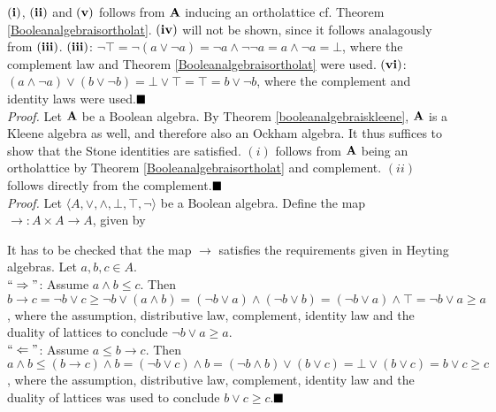 ${\bf (i)}$, ${\bf (ii)}$ and ${\bf (v)}$ follows from ${\bf A}$ inducing an ortholattice cf. Theorem \ref{Booleanalgebraisortholat}. ${\bf (iv)}$ will not be shown, since it follows analagously from ${\bf (iii)}$. ${\bf (iii)}$: $\lnot\top = \lnot(a\lor\lnot a)=\lnot a\land \lnot\lnot a = a\land\lnot a = \bot$, where the complement law and Theorem \ref{Booleanalgebraisortholat} were used. ${\bf (vi)}$: $(a\land\lnot a)\lor (b\lor \lnot b)=\bot\lor\top=\top=b\lor\lnot b$, where the complement and identity laws were used.$\qed$\\

\textit{Proof.}
Let ${\bf A}$ be a Boolean algebra. By Theorem \ref{booleanalgebraiskleene}, ${\bf A}$ is a Kleene algebra as well, and therefore also an Ockham algebra. It thus suffices to show that the Stone identities are satisfied. $(i)$ follows from ${\bf A}$ being an ortholattice by Theorem \ref{Booleanalgebraisortholat} and complement. $(ii)$ follows directly from the complement.$\qed$\\

\textit{Proof.}
Let $\langle A,\lor,\land,\bot,\top,\lnot\rangle$ be a Boolean algebra. Define the map $\to:A\times A\to A$, given by

It has to be checked that the map $\to$ satisfies the requirements given in Heyting algebras. Let $a,b,c\in A$.\\

$``\Rightarrow"$: Assume $a\land b\leq c$. Then $b\to c=\lnot b\lor c\geq \lnot b\lor (a\land b)=(\lnot b\lor a)\land(\lnot b\lor b)=(\lnot b\lor a)\land\top=\lnot b\lor a\geq a$, where the assumption, distributive law, complement, identity law and the duality of lattices to conclude $\lnot b\lor a\geq a$.\\

$``\Leftarrow"$: Assume $a\leq b\to c$. Then $a\land b\leq (b\to c)\land b=(\lnot b\lor c)\land b=(\lnot b\land b)\lor(b\lor c)=\bot\lor(b\lor c)=b\lor c\geq c$, where the assumption, distributive law, complement, identity law and the duality of lattices was used to conclude $b\lor c\geq c$.$\qed$\\
